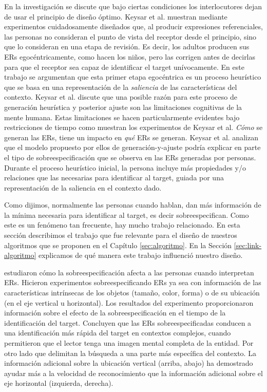 En la investigaci\'on \cite{keysar:Curr98} se discute que bajo ciertas condiciones los interlocutores dejan de usar el principio de dise\~no \'optimo. Keysar et al. muestran mediante experimentos cuidadosamente dise\~nados que, al producir expresiones referenciales, las personas no consideran el punto de vista del receptor desde el principio, sino que lo consideran en una etapa de revisi\'on. Es decir, los adultos producen sus ERs egoc\'entricamente, como hacen los ni\~nos, pero las corrigen antes de decirlas para que el receptor sea capaz de identificar el target un\'ivocamente.
En este trabajo se argumentan que esta primer etapa egoc\'entrica es un proceso heur\'istico que se basa en una representaci\'on de la \emph{saliencia} de las caracter\'isticas del contexto. Keysar et al. discute que una posible raz\'on para este proceso de generaci\'on heur\'istica y posterior ajuste son las limitaciones cognitivas de la mente humana. Estas limitaciones se hacen particularmente evidentes bajo restricciones de tiempo como muestran los experimentos de Keysar et al.
\emph{C\'omo} se generan las ERs, tiene un impacto en \emph{qu\'e} ERs se generan. Keysar et al. analizan que el modelo propuesto por ellos de generaci\'on-y-ajuste podr\'ia explicar en parte el tipo de sobreespecificaci\'on que se observa en las ERs generadas por personas. Durante el proceso heur\'istico inicial, la persona incluye m\'as propiedades y/o relaciones que las necesarias para identificar al target, guiada por una representaci\'on de la saliencia en el contexto dado.

Como dijimos, normalmente las personas cuando hablan, dan m\'as informaci\'on de la m\'inima necesaria para identificar al target, es decir sobreespecifican. Como este es un fen\'omeno tan frecuente, hay mucho trabajo relacionado. En esta secci\'on describimos el trabajo que fue relevante para el dise\~no de nuestros algoritmos que se proponen en el Cap\'itulo \ref{sec:algoritmo}. En la Secci\'on \ref{sec:link-algoritmo} explicamos de qu\'e manera este trabajo influenci\'o nuestro dise\~no.

\cite{arts} estudiaron c\'omo la sobreespecificaci\'on afecta a las personas cuando interpretan ERs. Hicieron experimentos sobreespecificando ERs ya sea con informaci\'on de las caracter\'isticas intr\'insecas de los objetos (tama\~no, color, forma) o de su ubicaci\'on (en el eje vertical u horizontal). Los resultados del experimento
proporcionaron informaci\'on sobre el efecto de la sobreespecificaci\'on en el tiempo de la identificaci\'on del target.
Concluyen que las ERs sobreespecificadas conducen a una identificaci\'on m\'as r\'apida del target en contextos complejos, cuando permitieron que el lector 
tenga una imagen mental completa de la entidad. Por otro lado que delimitan la b\'usqueda a una parte m\'as espec\'ifica
del contexto. La informaci\'on adicional sobre la ubicaci\'on vertical (arriba, abajo) ha demostrado ayudar m\'as a la velocidad de reconocimiento que la informaci\'on adicional sobre el eje horizontal (izquierda, derecha).

